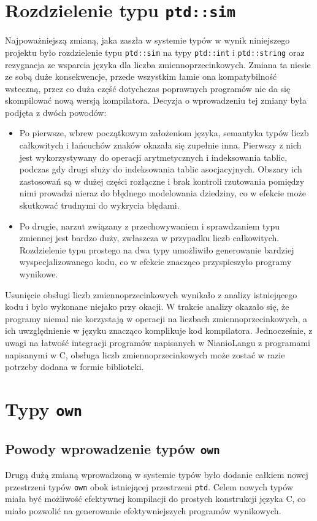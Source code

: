 \documentclass[licencjacka]{pracamgr}
\begin{document}
\section{Rozdzielenie typu \texttt{ptd::sim}}
Najpoważniejszą zmianą, jaka zaszła w systemie typów w wynik niniejszego projektu było rozdzielenie
typu \texttt{ptd::sim} na typy \texttt{ptd::int} i \texttt{ptd::string} oraz rezygnacja ze wsparcia
języka dla liczba zmiennoprzecinkowych. Zmiana ta niesie ze sobą duże konsekwencje, przede wszystkim łamie
ona kompatybilność wsteczną, przez co duża część dotychczas poprawnych programów nie da się skompilować nową
wersją kompilatora. Decyzja o wprowadzeniu tej zmiany była podjęta z dwóch powodów:
\begin{itemize}
 \item Po pierwsze, wbrew początkowym założeniom języka, semantyka typów liczb całkowitych i łańcuchów znaków
 okazała się zupełnie inna. Pierwszy z nich jest wykorzystywany do operacji arytmetycznych i indeksowania tablic,
 podczas gdy drugi służy do indeksowania tablic asocjacyjnych. Obszary ich zastosowań są w dużej części rozłączne
 i brak kontroli rzutowania pomiędzy nimi prowadzi nieraz do błędnego modelowania dziedziny, co w efekcie
 może skutkować trudnymi do wykrycia błędami.
 \item Po drugie, narzut związany z przechowywaniem i sprawdzaniem typu zmiennej jest bardzo duży, zwłaszcza
 w przypadku liczb całkowitych. Rozdzielenie typu prostego na dwa typy umożliwiło generowanie bardziej
 wyspecjalizowanego kodu, co w efekcie znacząco przyspieszyło programy wynikowe.
\end{itemize}
Usunięcie obsługi liczb zmiennoprzecinkowych wynikało z analizy istniejącego kodu i było wykonane niejako
przy okacji. W trakcie analizy okazało się, że programy niemal nie korzystają w operacji na liczbach
zmiennoprzecinkowych, a ich uwzględnienie w języku znacząco komplikuje kod kompilatora. Jednocześnie,
z uwagi na łatwość integracji programów napisanych w NianioLangu z programami napisanymi w C, obsługa
liczb zmiennoprzecinkowych może zostać w razie potrzeby dodana w formie biblioteki.

\section{Typy \texttt{own}}
\subsection{Powody wprowadzenie typów \texttt{own}}
Drugą dużą zmianą wprowadzoną w systemie typów było dodanie całkiem nowej przestrzeni typów \texttt{own} obok
istniejącej przestrzeni \texttt{ptd}. Celem nowych typów miała być możliwość efektywnej kompilacji do
prostych konstrukcji języka C, co miało pozwolić na generowanie efektywniejszych programów wynikowych. 
\end{document}
